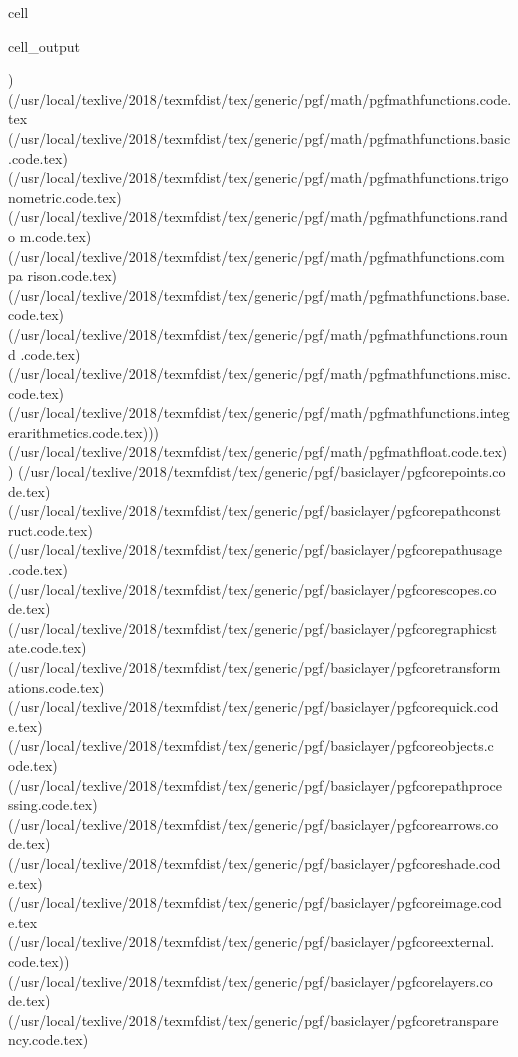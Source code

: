 \documentclass[letterpaper,10pt,english]{jupyterBook}
\begin{document}
\begin{sphinxuseclass}{cell}
\begin{sphinxVerbatimOutput}
\begin{sphinxuseclass}{cell_output}
\begin{sphinxVerbatim}[commandchars=\\\{\}]
)
(/usr/local/texlive/2018/texmf\PYGZhy{}dist/tex/generic/pgf/math/pgfmathfunctions.code.
tex
(/usr/local/texlive/2018/texmf\PYGZhy{}dist/tex/generic/pgf/math/pgfmathfunctions.basic
.code.tex)
(/usr/local/texlive/2018/texmf\PYGZhy{}dist/tex/generic/pgf/math/pgfmathfunctions.trigo
nometric.code.tex)
(/usr/local/texlive/2018/texmf\PYGZhy{}dist/tex/generic/pgf/math/pgfmathfunctions.rando
m.code.tex)
(/usr/local/texlive/2018/texmf\PYGZhy{}dist/tex/generic/pgf/math/pgfmathfunctions.compa
rison.code.tex)
(/usr/local/texlive/2018/texmf\PYGZhy{}dist/tex/generic/pgf/math/pgfmathfunctions.base.
code.tex)
(/usr/local/texlive/2018/texmf\PYGZhy{}dist/tex/generic/pgf/math/pgfmathfunctions.round
.code.tex)
(/usr/local/texlive/2018/texmf\PYGZhy{}dist/tex/generic/pgf/math/pgfmathfunctions.misc.
code.tex)
(/usr/local/texlive/2018/texmf\PYGZhy{}dist/tex/generic/pgf/math/pgfmathfunctions.integ
erarithmetics.code.tex)))
(/usr/local/texlive/2018/texmf\PYGZhy{}dist/tex/generic/pgf/math/pgfmathfloat.code.tex)
)
(/usr/local/texlive/2018/texmf\PYGZhy{}dist/tex/generic/pgf/basiclayer/pgfcorepoints.co
de.tex)
(/usr/local/texlive/2018/texmf\PYGZhy{}dist/tex/generic/pgf/basiclayer/pgfcorepathconst
ruct.code.tex)
(/usr/local/texlive/2018/texmf\PYGZhy{}dist/tex/generic/pgf/basiclayer/pgfcorepathusage
.code.tex)
(/usr/local/texlive/2018/texmf\PYGZhy{}dist/tex/generic/pgf/basiclayer/pgfcorescopes.co
de.tex)
(/usr/local/texlive/2018/texmf\PYGZhy{}dist/tex/generic/pgf/basiclayer/pgfcoregraphicst
ate.code.tex)
(/usr/local/texlive/2018/texmf\PYGZhy{}dist/tex/generic/pgf/basiclayer/pgfcoretransform
ations.code.tex)
(/usr/local/texlive/2018/texmf\PYGZhy{}dist/tex/generic/pgf/basiclayer/pgfcorequick.cod
e.tex)
(/usr/local/texlive/2018/texmf\PYGZhy{}dist/tex/generic/pgf/basiclayer/pgfcoreobjects.c
ode.tex)
(/usr/local/texlive/2018/texmf\PYGZhy{}dist/tex/generic/pgf/basiclayer/pgfcorepathproce
ssing.code.tex)
(/usr/local/texlive/2018/texmf\PYGZhy{}dist/tex/generic/pgf/basiclayer/pgfcorearrows.co
de.tex)
(/usr/local/texlive/2018/texmf\PYGZhy{}dist/tex/generic/pgf/basiclayer/pgfcoreshade.cod
e.tex)
(/usr/local/texlive/2018/texmf\PYGZhy{}dist/tex/generic/pgf/basiclayer/pgfcoreimage.cod
e.tex
(/usr/local/texlive/2018/texmf\PYGZhy{}dist/tex/generic/pgf/basiclayer/pgfcoreexternal.
code.tex))
(/usr/local/texlive/2018/texmf\PYGZhy{}dist/tex/generic/pgf/basiclayer/pgfcorelayers.co
de.tex)
(/usr/local/texlive/2018/texmf\PYGZhy{}dist/tex/generic/pgf/basiclayer/pgfcoretranspare
ncy.code.tex)

\end{sphinxVerbatim}
\end{sphinxuseclass}
\end{sphinxVerbatimOutput}
\end{sphinxuseclass}
\end{document}

